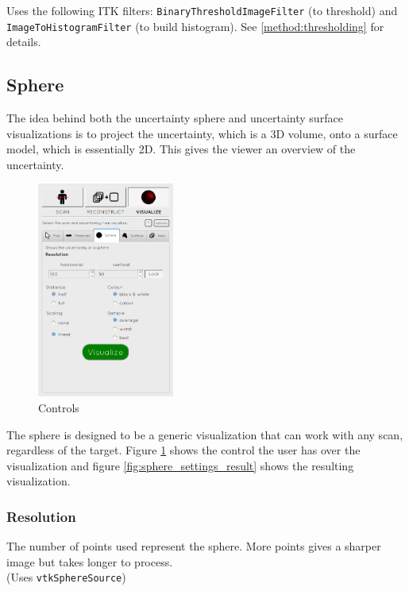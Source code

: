 Uses the following ITK filters: \texttt{BinaryThresholdImageFilter} (to threshold) and \\\texttt{ImageToHistogramFilter} (to build histogram). See \ref{method:thresholding} for details.

\clearpage
\subsection{Sphere}\label{implementation:sphere}
The idea behind both the uncertainty sphere and uncertainty surface visualizations is to project the uncertainty, which is a 3D volume, onto a surface model, which is essentially 2D. This gives the viewer an overview of the uncertainty.

\begin{figure}
  \vspace{-20pt}
  \includegraphics[width=0.4\textwidth]{images/tool/3_sphere.png}
  \caption{Controls}\label{fig:sphere_settings}
\end{figure}

The sphere is designed to be a generic visualization that can work with any scan, regardless of the target. Figure \ref{fig:sphere_settings} shows the control the user has over the visualization and figure \ref{fig:sphere_settings_result} shows the resulting visualization.

\subsubsection{Resolution}
The number of points used represent the sphere. More points gives a sharper image but takes longer to process.\\(Uses \texttt{vtkSphereSource})

